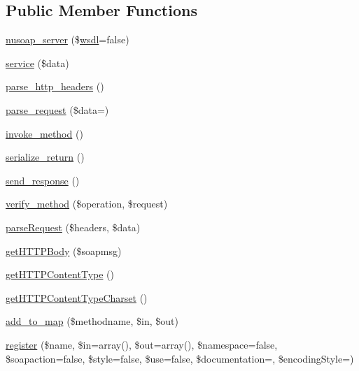 \subsection*{Public Member Functions}
\begin{DoxyCompactItemize}
\item 
\hyperlink{classnusoap__server_a367515afa8e8ec27dc922dc2d66677d0}{nusoap\+\_\+server} (\$\hyperlink{classwsdl}{wsdl}=false)
\item 
\hyperlink{classnusoap__server_ad91e2ca0020e1192392077915db92e41}{service} (\$data)
\item 
\hyperlink{classnusoap__server_aa7d62dcdbc6b24667691c66700bec2ea}{parse\+\_\+http\+\_\+headers} ()
\item 
\hyperlink{classnusoap__server_ac1c98672ed25f0f3b8a7470a342f45c0}{parse\+\_\+request} (\$data=\textquotesingle{}\textquotesingle{})
\item 
\hyperlink{classnusoap__server_afa0f240a77cba882ddb1096255aaa88c}{invoke\+\_\+method} ()
\item 
\hyperlink{classnusoap__server_a2d107db4f89e00b4028dbfb2827c40dd}{serialize\+\_\+return} ()
\item 
\hyperlink{classnusoap__server_a5639906d44165650fa1ee610f2435e89}{send\+\_\+response} ()
\item 
\hyperlink{classnusoap__server_a6621bf070937d91b20824bceedac26f4}{verify\+\_\+method} (\$operation, \$request)
\item 
\hyperlink{classnusoap__server_a7a69990540b6dc277f2775abd40772a1}{parse\+Request} (\$headers, \$data)
\item 
\hyperlink{classnusoap__server_ab1e22b0858bdbe61d2d711ff442c0e78}{get\+H\+T\+T\+P\+Body} (\$soapmsg)
\item 
\hyperlink{classnusoap__server_a2bed19ef2d537dee244535339cd6026a}{get\+H\+T\+T\+P\+Content\+Type} ()
\item 
\hyperlink{classnusoap__server_a9051db33a9b7e50315d9222ef1c52ce9}{get\+H\+T\+T\+P\+Content\+Type\+Charset} ()
\item 
\hyperlink{classnusoap__server_ad2e47223401828fb5e5fe54733abaf9a}{add\+\_\+to\+\_\+map} (\$methodname, \$in, \$out)
\item 
\hyperlink{classnusoap__server_a17b5ba99bab794b0a9584592f6e23b04}{register} (\$name, \$in=array(), \$out=array(), \$namespace=false, \$soapaction=false, \$style=false, \$use=false, \$documentation=\textquotesingle{}\textquotesingle{}, \$encoding\+Style=\textquotesingle{}\textquotesingle{})
\item 

\end{DoxyCompactItemize}

